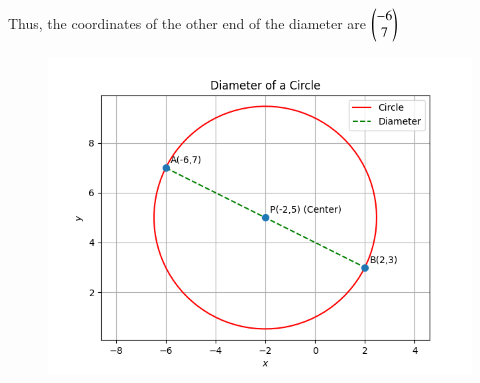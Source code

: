 \documentclass[journal]{IEEEtran}
\begin{document}
Thus, the coordinates of the other end of the diameter are $\begin{pmatrix}-6 \\ 7\end{pmatrix}$

\begin{figure}[H]
   \centering
  \includegraphics[width=0.7\columnwidth]{figs/fig1.png}
   \caption{}
   \label{fig:1}
\end{figure}
\end{document}
